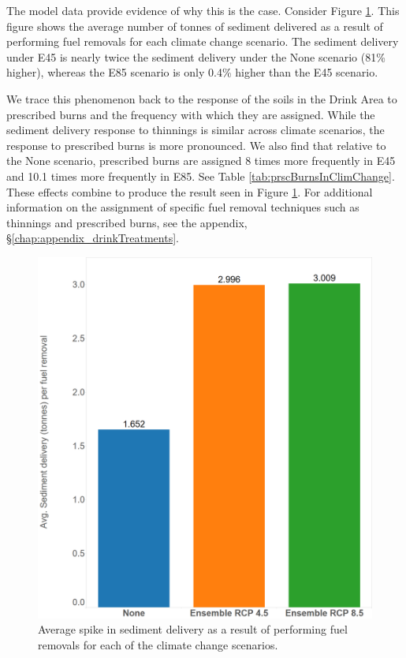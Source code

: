 The model data provide evidence of why this is the case. Consider Figure \ref{fig:avgSedimentDelivery}. This figure shows the average number of tonnes of sediment delivered as a result of performing fuel removals for each climate change scenario. The sediment delivery under E45 is nearly twice the sediment delivery under the None scenario (81\% higher), whereas the E85 scenario is only 0.4\% higher than the E45 scenario.

We trace this phenomenon back to the response of the soils in the Drink Area to prescribed burns and the frequency with which they are assigned. While the sediment delivery response to thinnings is similar across climate scenarios, the response to prescribed burns is more pronounced. We also find that relative to the None scenario, prescribed burns are assigned 8 times more frequently in E45 and 10.1 times more frequently in E85. See Table \ref{tab:prscBurnsInClimChange}. These effects combine to produce the result seen in Figure \ref{fig:avgSedimentDelivery}. For additional information on the assignment of specific fuel removal techniques such as thinnings and prescribed burns, see the appendix, \S \ref{chap:appendix_drinkTreatments}.

\begin{figure}[ht]
\centering
\includegraphics[width=.55\textwidth]{../images/AvgSedimentSpikes}
\caption[Average sediment delivery across climate scenarios]{Average spike in sediment delivery as a result of performing fuel removals for each of the climate change scenarios.}
\label{fig:avgSedimentDelivery}
\end{figure}

